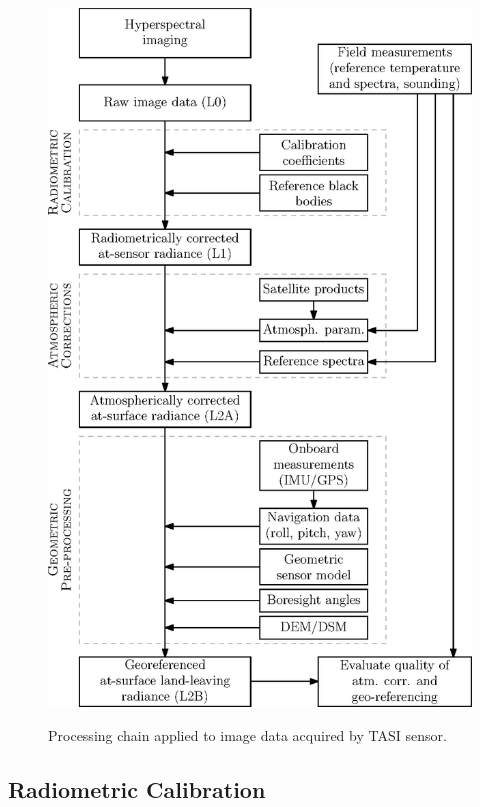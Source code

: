 \begin{figure}[thb]
	\centering
	\vspace{0.7 em}
	\includegraphics[scale=1]{pics/Chapter_02/Fig_2_3.eps}
	\label{fig:ProcessingChain}
	\vspace{2 em}
	\caption{Processing chain applied to image data acquired by TASI sensor.}
	\label{fig:ProcessingChain}
	\vspace{0.7 em}
\end{figure}


\subsection{Radiometric Calibration}


